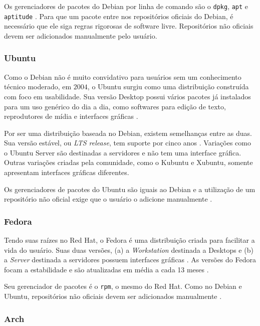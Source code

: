 \documentclass[
article,			%
12pt,				%
openright,			%
oneside,			%
a4paper,			%
chapter=TITLE,		%
section=TITLE,		%
subsection=TITLE,	%
subsubsection=TITLE,%
subsubsubsection=TITLE, %
english,			%
brazil,				%
]{abntex2}
\def\code#1{\texttt{#1}}
\begin{document}
Os gerenciadores de pacotes do Debian por linha de comando são o
\code{dpkg}, \code{apt} e \code{aptitude} \cite{Debian2016}. Para que
um pacote entre nos repositórios oficiais do Debian, é necessário que
ele siga regras rigorosas de software livre. Repositórios não oficiais
devem ser adicionados manualmente pelo usuário.

\subsubsection{Ubuntu}

Como o Debian não é muito convidativo para usuários sem um
conhecimento técnico moderado, em $2004$, o Ubuntu surgiu como uma
distribuição construída com foco em usabilidade. Sua versão Desktop
possui vários pacotes já instalados para um uso genérico do dia a dia,
como softwares para edição de texto, reprodutores de mídia e
interfaces gráficas \cite{UbuntuFundation2018}.

Por ser uma distribuição baseada no Debian, existem semelhanças entre
as duas. Sua versão estável, ou \emph{LTS release}, tem suporte por
cinco anos \cite{UbuntuWiki2017}. Variações como o Ubuntu Server são
destinadas a servidores e não tem uma interface gráfica. Outras
variações criadas pela comunidade, como o Kubuntu e Xubuntu, somente
apresentam interfaces gráficas diferentes.

Os gerenciadores de pacotes do Ubuntu são iguais ao Debian e a
utilização de um repositório não oficial exige que o usuário o
adicione manualmente \cite{UbuntuWiki2018}.

\subsubsection{Fedora}

Tendo suas raízes no Red Hat, o Fedora é uma distribuição criada para
facilitar a vida do usuário. Suas duas versões, (a) a
\emph{Workstation} destinada a Desktops e (b) a \emph{Server}
destinada a servidores possuem interfaces gráficas
\cite{FedoraProject2018}. As versões do Fedora focam a estabilidade e
são atualizadas em média a cada 13 meses \cite{FedoraProject2018a}.

Seu gerenciador de pacotes é o \code{rpm}, o mesmo do Red Hat. Como no
Debian e Ubuntu, repositórios não oficiais devem ser adicionados
manualmente \cite{FedoraProject2018b}.

\subsubsection{Arch}
\end{document}
